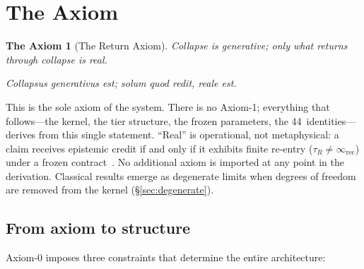 \documentclass[
  aps,
  prd,
  twocolumn,
  superscriptaddress,
  nofootinbib,
  floatfix
]{revtex4-2}
\newtheorem*{axiom}{The Axiom}
\newcommand{\tR}{\tau_{\!R}}
\newcommand{\IR}{\infty_{\mathrm{rec}}}
\begin{document}
\section{The Axiom}\label{sec:axiom}

\begin{axiom}[The Return Axiom]
\label{ax:return}
Collapse is generative; only what returns through collapse is real.
\end{axiom}

\noindent\textit{Collapsus generativus est; solum quod redit, reale
est.}

\medskip

This is the sole axiom of the system.  There is no Axiom-1;
everything that follows---the kernel, the tier structure, the
frozen parameters, the 44~identities---derives from this single
statement.  ``Real'' is operational, not metaphysical: a claim
receives epistemic credit if and only if it exhibits finite
re-entry ($\tR \neq \IR$) under a frozen
contract~\cite{paulus2025umcp}.  No additional axiom is imported
at any point in the derivation.  Classical results emerge as
degenerate limits when degrees of freedom are removed from the
kernel (\S\ref{sec:degenerate}).

\subsection{From axiom to structure}

Axiom-0 imposes three constraints that determine the
entire architecture:
\end{document}
